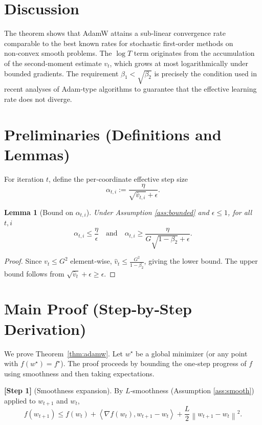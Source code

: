 \documentclass{article}
\newtheorem{lemma}{Lemma}
\newcommand{\norm}[1]{\left\lVert#1\right\rVert}
\newcommand{\ip}[2]{\left\langle #1,#2\right\rangle}
\begin{document}
\section*{Discussion}
The theorem shows that AdamW attains a sub‑linear convergence rate comparable to the best known rates for stochastic first‑order methods on non‑convex smooth problems. The $\log T$ term originates from the accumulation of the second‑moment estimate $v_t$, which grows at most logarithmically under bounded gradients. The requirement $\beta_1<\sqrt{\beta_2}$ is precisely the condition used in recent analyses of Adam‑type algorithms to guarantee that the effective learning rate does not diverge.

\section*{Preliminaries (Definitions and Lemmas)}
\begin{definition}
For iteration $t$, define the per‑coordinate effective step size
\[
\alpha_{t,i}:=\frac{\eta}{\sqrt{\hat v_{t,i}}+\epsilon}.
\]
\end{definition}
\begin{lemma}[Bound on $\alpha_{t,i}$]\label{lem:alpha}
Under Assumption \ref{ass:bounded} and $\epsilon\le 1$, for all $t,i$
\[
\alpha_{t,i}\le \frac{\eta}{\epsilon}
\quad\text{and}\quad
\alpha_{t,i}\ge \frac{\eta}{G\sqrt{1-\beta_2}+\epsilon}.
\]
\end{lemma}
\begin{proof}
Since $v_t\le G^2$ element‑wise, $\hat v_t\le \frac{G^2}{1-\beta_2}$, giving the lower bound. The upper bound follows from $\sqrt{\hat v_t}+\epsilon\ge\epsilon$.
\end{proof}

\section*{Main Proof (Step‑by‑Step Derivation)}
We prove Theorem~\ref{thm:adamw}. Let $w^\star$ be a global minimizer (or any point with $f(w^\star)=f^\star$). The proof proceeds by bounding the one‑step progress of $f$ using smoothness and then taking expectations.

\noindent\textbf{[Step 1]} (Smoothness expansion). By $L$‑smoothness (Assumption \ref{ass:smooth}) applied to $w_{t+1}$ and $w_t$,
\begin{equation}
f(w_{t+1})\le f(w_t)+\ip{\nabla f(w_t)}{w_{t+1}-w_t}
+\frac{L}{2}\norm{w_{t+1}-w_t}^2 .
\label{eq:smooth}
\end{equation}
\end{document}
